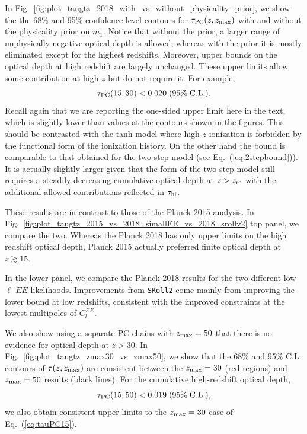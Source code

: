 \documentclass[aps,prd,twocolumn,amsmath,amssymb,showpacs,floatfix,superscriptaddress,nofootinbib]{revtex4-1}
\newcommand{\zmax}{z_{\rm max}}
\newcommand{\beq}{\begin{equation}}
\newcommand{\eeq}{\end{equation}}
\begin{document}
{In Fig.~\ref{fig:plot_taugtz_2018_with_vs_without_physicality_prior}, we show the 
the 68\% and 95\% confidence level contours for  $\tau_{\rm PC}(z,z_{\rm max})$ with and without the physicality prior on $m_1$.  Notice that without the prior, a larger range of unphysically negative optical depth is allowed, whereas with the prior it is mostly eliminated except for the highest redshifts.  Moreover, upper bounds on the optical depth at high 
redshift are largely unchanged.   These upper limits allow some contribution at high-$z$ but do not require it.   For example,
%
\beq
\tau_{\rm PC}(15, 30) < 0.020 \; (95\%\; \mathrm{C.L.}).
\label{eq:tauPC15}
\eeq
%
Recall again that we are reporting the one-sided upper limit here in the text, which is slightly lower than values at the contours shown in the figures.
This should be contrasted with the tanh model 
where  high-$z$ ionization is forbidden by the functional form of the ionization history.
On the other hand the bound is comparable to that obtained for the two-step model (see Eq.~(\ref{eq:2stepbound})).  It is actually slightly larger given that the form of the two-step model still requires a steadily decreasing cumulative optical depth at $z>z_{\rm re}$ with the additional allowed contributions reflected in $\tau_{\rm hi}$.
 
These results are in contrast to those of the Planck 2015 analysis. In Fig.~\ref{fig:plot_taugtz_2015_vs_2018_simallEE_vs_2018_srollv2} top panel, we compare
the two. Whereas the Planck 2018 has only upper limits on the high redshift optical depth, Planck 2015 actually preferred
finite optical depth at $z\gtrsim 15$.

In the lower panel, we compare the Planck 2018 results for the two different low-$\ell$ $EE$ likelihoods.  Improvements from \texttt{SRoll2} come mainly from improving the lower bound at low redshifts, consistent with the improved constraints at the lowest multipoles of $C_l^{EE}$.

We also show using a separate PC chains with $\zmax = 50$ that there is no evidence for optical depth at $z>30$. 
In Fig.~\ref{fig:plot_taugtz_zmax30_vs_zmax50}, we show that the 68\% and 95\% C.L. contours of $\tau(z, \zmax)$ are consistent between the $\zmax = 30$ (red regions) and $\zmax = 50$ results (black lines). For the cumulative high-redshift optical depth,
\beq
\tau_{\rm PC}(15, 50) < 0.019 \; (95\%\; \mathrm{C.L.}),
\eeq
we also obtain consistent upper limits to the $\zmax=30$ case of Eq.~(\ref{eq:tauPC15}).

}
\end{document}
